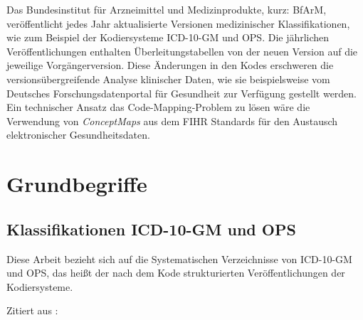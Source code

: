 \begin{comment}
\bibitem{medinf-init}
Medizininformatik-Initiative \newline
\url{https://www.medizininformatik-initiative.de/de/start}

\bibitem{fdpg}
Deutsches Forschungsdatenportal für Gesundheit \newline
\url{https://forschen-fuer-gesundheit.de}
\end{comment}

Das Bundesinstitut für Arzneimittel und Medizinprodukte, kurz: BfArM, veröffentlicht jedes Jahr aktualisierte Versionen medizinischer Klassifikationen, wie zum Beispiel der Kodiersysteme ICD-10-GM und OPS. Die jährlichen Veröffentlichungen enthalten Überleitungstabellen von der neuen Version auf die jeweilige Vorgängerversion. Diese Änderungen in den Kodes erschweren die versionsübergreifende Analyse klinischer Daten, wie sie beispielsweise vom Deutsches Forschungsdatenportal für Gesundheit \cite{medinf-init} zur Verfügung gestellt werden. Ein technischer Ansatz das Code-Mapping-Problem zu lösen wäre die Verwendung von \emph{ConceptMaps} aus dem FIHR Standards für den Austausch elektronischer Gesundheitsdaten.

\section{Grundbegriffe}
\subsection{Klassifikationen ICD-10-GM und OPS}

Diese Arbeit bezieht sich auf die Systematischen Verzeichnisse von ICD-10-GM und OPS, das heißt der nach dem Kode strukturierten Veröffentlichungen der Kodiersysteme. 


Zitiert aus \cite[Seite 97]{gaus2005dokumentation}:


